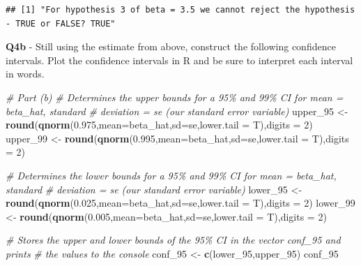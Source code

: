 \documentclass[
]{article}
\newenvironment{Shaded}{\begin{snugshade}}{\end{snugshade}}
\newcommand{\AttributeTok}[1]{\textcolor[rgb]{0.13,0.29,0.53}{#1}}
\newcommand{\CommentTok}[1]{\textcolor[rgb]{0.56,0.35,0.01}{\textit{#1}}}
\newcommand{\DecValTok}[1]{\textcolor[rgb]{0.00,0.00,0.81}{#1}}
\newcommand{\FloatTok}[1]{\textcolor[rgb]{0.00,0.00,0.81}{#1}}
\newcommand{\FunctionTok}[1]{\textcolor[rgb]{0.13,0.29,0.53}{\textbf{#1}}}
\newcommand{\NormalTok}[1]{#1}
\newcommand{\OtherTok}[1]{\textcolor[rgb]{0.56,0.35,0.01}{#1}}
\begin{document}
\begin{verbatim}
## [1] "For hypothesis 3 of beta = 3.5 we cannot reject the hypothesis - TRUE or FALSE? TRUE"
\end{verbatim}

\hfill\break
\hfill\break

\textbf{Q4b} - Still using the estimate from above, construct the
following confidence intervals. Plot the confidence intervals in R and
be sure to interpret each interval in words.

\hfill\break

\begin{Shaded}
\begin{Highlighting}[]
\CommentTok{\# Part (b)}
\CommentTok{\# Determines the upper bounds for a 95\% and 99\% CI for mean = beta\_hat, standard}
\CommentTok{\# deviation = se (our standard error variable)}
\NormalTok{upper\_95 }\OtherTok{\textless{}{-}} \FunctionTok{round}\NormalTok{(}\FunctionTok{qnorm}\NormalTok{(}\FloatTok{0.975}\NormalTok{,}\AttributeTok{mean=}\NormalTok{beta\_hat,}\AttributeTok{sd=}\NormalTok{se,}\AttributeTok{lower.tail =}\NormalTok{ T),}\AttributeTok{digits =} \DecValTok{2}\NormalTok{)}
\NormalTok{upper\_99 }\OtherTok{\textless{}{-}} \FunctionTok{round}\NormalTok{(}\FunctionTok{qnorm}\NormalTok{(}\FloatTok{0.995}\NormalTok{,}\AttributeTok{mean=}\NormalTok{beta\_hat,}\AttributeTok{sd=}\NormalTok{se,}\AttributeTok{lower.tail =}\NormalTok{ T),}\AttributeTok{digits =} \DecValTok{2}\NormalTok{)}

\CommentTok{\# Determines the lower bounds for a 95\% and 99\% CI for mean = beta\_hat, standard}
\CommentTok{\# deviation = se (our standard error variable)}
\NormalTok{lower\_95 }\OtherTok{\textless{}{-}} \FunctionTok{round}\NormalTok{(}\FunctionTok{qnorm}\NormalTok{(}\FloatTok{0.025}\NormalTok{,}\AttributeTok{mean=}\NormalTok{beta\_hat,}\AttributeTok{sd=}\NormalTok{se,}\AttributeTok{lower.tail =}\NormalTok{ T),}\AttributeTok{digits =} \DecValTok{2}\NormalTok{)}
\NormalTok{lower\_99 }\OtherTok{\textless{}{-}} \FunctionTok{round}\NormalTok{(}\FunctionTok{qnorm}\NormalTok{(}\FloatTok{0.005}\NormalTok{,}\AttributeTok{mean=}\NormalTok{beta\_hat,}\AttributeTok{sd=}\NormalTok{se,}\AttributeTok{lower.tail =}\NormalTok{ T),}\AttributeTok{digits =} \DecValTok{2}\NormalTok{)}

\CommentTok{\# Stores the upper and lower bounds of the 95\% CI in the vector \textquotesingle{}conf\_95\textquotesingle{} and prints}
\CommentTok{\# the values to the console}
\NormalTok{conf\_95 }\OtherTok{\textless{}{-}} \FunctionTok{c}\NormalTok{(lower\_95,upper\_95)}
\NormalTok{conf\_95}
\end{Highlighting}
\end{Shaded}
\end{document}
